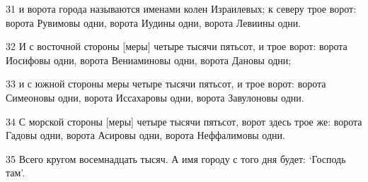 \par 31 и ворота города называются именами колен Израилевых; к северу трое ворот: ворота Рувимовы одни, ворота Иудины одни, ворота Левиины одни.
\par 32 И с восточной стороны [меры] четыре тысячи пятьсот, и трое ворот: ворота Иосифовы одни, ворота Вениаминовы одни, ворота Дановы одни;
\par 33 и с южной стороны меры четыре тысячи пятьсот, и трое ворот: ворота Симеоновы одни, ворота Иссахаровы одни, ворота Завулоновы одни.
\par 34 С морской стороны [меры] четыре тысячи пятьсот, ворот здесь трое же: ворота Гадовы одни, ворота Асировы одни, ворота Неффалимовы одни.
\par 35 Всего кругом восемнадцать тысяч. А имя городу с того дня будет: `Господь там'.


